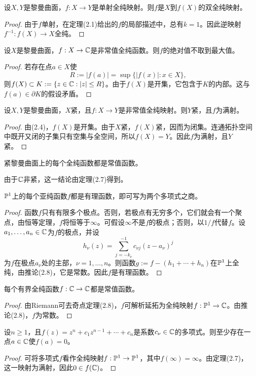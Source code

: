 设$X,Y$是黎曼曲面，$f:X\to Y$是单射全纯映射。则$f$是$X$到$f(X)$的双全纯映射。
\begin{proof}
由于$f$单射，在定理(2.1)给出的$f$的局部描述中，总有$k=1$。因此逆映射$f^{-1}:f(X)\to X$全纯。
\end{proof}

设$X$是黎曼曲面，$f:X\to\mathbb C$是非常值全纯函数。则$f$的绝对值不取到最大值。
\begin{proof}
若存在点$a\in X$使
\[
R:=|f(a)|=\sup\{|f(x)|:x\in X\},
\]
则$f(X)\subset K:=\{z\in\mathbb C:|z|\le R\}$。由于$f(X)$是开集，它包含于$K$的内部。这与$f(a)\in\partial K$的假设矛盾。
\end{proof}

设$X,Y$是黎曼曲面，$X$紧，且$f:X\to Y$是非常值全纯映射。则$Y$紧，且$f$为满射。
\begin{proof}
由(2.4)，$f(X)$是开集。由于$X$紧，$f(X)$紧，因而为闭集。连通拓扑空间中既开又闭的子集只有空集与全空间，所以$f(X)=Y$。因此$f$为满射，且$Y$紧。
\end{proof}

紧黎曼曲面上的每个全纯函数都是常值函数。

由于$\mathbb C$非紧，这一结论由定理(2.7)得到。

$\mathbb P^1$上的每个亚纯函数$f$都是有理函数，即可写为两个多项式之商。
\begin{proof}
函数$f$只有有限多个极点。否则，若极点有无穷多个，它们就会有一个聚点，由恒等定理，$f$将恒等于$\infty$。可假设$\infty$不是$f$的极点；否则，以$1/f$代替$f$。设$a_1,\ldots,a_n\in\mathbb C$为$f$的极点，并设
\[
h_\nu(z)=\sum_{j=-k_\nu}^{-1}c_{\nu j}(z-a_\nu)^j
\]
为$f$在极点$a_\nu$处的主部，$\nu=1,\ldots,n$。则函数$g:=f-(h_1+\cdots+h_n)$在$\mathbb P^1$上全纯，由推论(2.8)，它是常数。因此$f$是有理函数。
\end{proof}

每个有界全纯函数$f:\mathbb C\to\mathbb C$都是常值函数。
\begin{proof}
由Riemann可去奇点定理(2.8)，$f$可解析延拓为全纯映射$f:\mathbb P^1\to\mathbb C$。由推论(2.8)，$f$为常数。
\end{proof}

设$n\ge1$，且$f(z)=z^n+c_1z^{n-1}+\cdots+c_n$是系数$c_\nu\in\mathbb C$的多项式。则至少存在一点$a\in\mathbb C$使$f(a)=0$。
\begin{proof}
可将多项式$f$看作全纯映射$f:\mathbb P^1\to\mathbb P^1$，其中$f(\infty)=\infty$。由定理(2.7)，这一映射为满射，因此$0\in f(\mathbb C)$。
\end{proof}

